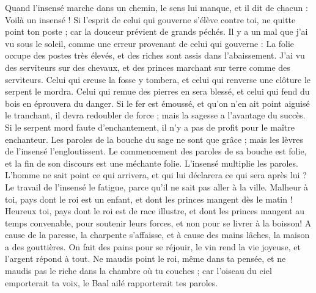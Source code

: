 \begin{multicols}{2}
Quand l’insensé marche dans un chemin, le sens lui manque, et il dit de chacun : Voilà un insensé !
Si l'esprit de celui qui gouverne s'élève contre toi, ne quitte point ton poste ; car la douceur prévient de grands péchés.
Il y a un mal que j'ai vu sous le soleil, comme une erreur provenant de celui qui gouverne :
La folie occupe des postes très élevés, et des riches sont assis dans l’abaissement.
J'ai vu des serviteurs sur des chevaux, et des princes marchant sur terre comme des serviteurs.
Celui qui creuse la fosse y tombera, et celui qui renverse une clôture le serpent le mordra.
Celui qui remue des pierres en sera blessé, et celui qui fend du bois en éprouvera du danger.
Si le fer est émoussé, et qu'on n'en ait point aiguisé le tranchant, il devra redoubler de force ; mais la sagesse a l’avantage du succès.
Si le serpent mord faute d’enchantement, il n’y a pas de profit pour le maître enchanteur.
Les paroles de la bouche du sage ne sont que grâce ; mais les lèvres de l’insensé l’engloutissent.
Le commencement des paroles de sa bouche est folie, et la fin de son discours est une méchante folie.
L’insensé multiplie les paroles. L'homme ne sait point ce qui arrivera, et qui lui déclarera ce qui sera après lui ?
Le travail de l’insensé le fatigue, parce qu’il ne sait pas aller à la ville.
Malheur à toi, pays dont le roi est un enfant, et dont les princes mangent dès le matin !
Heureux toi, pays dont le roi est de race illustre, et dont les princes mangent au temps convenable, pour soutenir leurs forces, et non pour se livrer à la boisson!
A cause de la paresse, la charpente s'affaisse, et à cause des mains lâches, la maison a des gouttières.
On fait des pains pour se réjouir, le vin rend la vie joyeuse, et l'argent répond à tout.
Ne maudis point le roi, même dans ta pensée, et ne maudis pas le riche dans la chambre où tu couches ; car l’oiseau du ciel emporterait ta voix, le Baal ailé rapporterait tes paroles.

\end{multicols}
